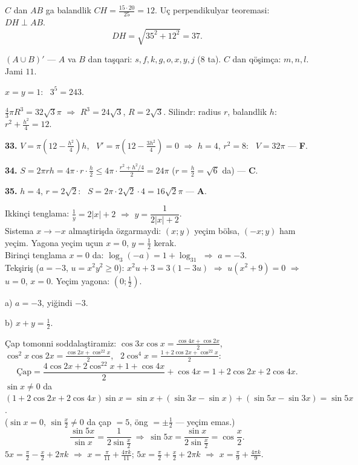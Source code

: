 $C$ dan $AB$ ga balandlik $CH=\frac{15\cdot20}{25}=12$. Uç perpendikulyar teoremasi: $DH\perp AB$.
\[DH=\sqrt{35^2+12^2}=37.\]

$(A\cup B)'$ — $A$ va $B$ dan taşqari: $s,f,k,g,o,x,y,j$ ($8$ ta). $C$ dan qöşimça: $m,n,l$. Jami $11$.

$x=y=1$: \ $3^5=243$.

\newpage
{}
$\frac43\pi R^3=32\sqrt3\pi$ $\Rightarrow$ $R^3=24\sqrt3$, $R=2\sqrt3$. Silindr: radius $r$, balandlik $h$: $r^2+\frac{h^2}4=12$.

\textbf{33.} $V=\pi\left(12-\frac{h^2}4\right)h$, \ $V'=\pi\left(12-\frac{3h^2}4\right)=0$ $\Rightarrow$ $h=4$, $r^2=8$: \ $V=32\pi$ — \textbf{F}.

\textbf{34.} $S=2\pi rh=4\pi\cdot r\cdot\frac h2\le4\pi\cdot\frac{r^2+h^2/4}2=24\pi$ ($r=\frac h2=\sqrt6$ da) — \textbf{C}.

\textbf{35.} $h=4$, $r=2\sqrt2$: \ $S=2\pi\cdot2\sqrt2\cdot4=16\sqrt2\pi$ — \textbf{A}.

\newpage
{}
Ikkinçi tenglama: $\frac1y=2|x|+2$ $\Rightarrow$ $y=\dfrac1{2|x|+2}$.\\
Sistema $x\to-x$ almaştirişda özgarmaydi: $(x;y)$ yeçim bölsa, $(-x;y)$ ham yeçim. Yagona yeçim uçun $x=0$, $y=\frac12$ kerak.\\
Birinçi tenglama $x=0$ da: $\log_3(-a)=1+\log_31$ $\Rightarrow$ $a=-3$.\\
Tekşiriş ($a=-3$, $u=x^2y^2\ge0$): $x^2u+3=3(1-3u)$ $\Rightarrow$ $u\left(x^2+9\right)=0$ $\Rightarrow$ $u=0$, $x=0$. Yeçim yagona: $\left(0;\frac12\right)$.

a) $a=-3$, yiğindi $-3$.

b) $x+y=\frac12$.

\newpage
{}
Çap tomonni soddalaştiramiz: $\cos3x\cos x=\frac{\cos4x+\cos2x}2$, \ $\cos^2x\cos2x=\frac{\cos2x+\cos^22x}2$, \ $2\cos^4x=\frac{1+2\cos2x+\cos^22x}2$:
\[\text{Çap}=\frac{4\cos2x+2\cos^22x+1+\cos4x}2+\cos4x=1+2\cos2x+2\cos4x.\]
$\sin x\ne0$ da $\left(1+2\cos2x+2\cos4x\right)\sin x=\sin x+\left(\sin3x-\sin x\right)+\left(\sin5x-\sin3x\right)=\sin5x$.\\
($\sin x=0$, $\sin\frac x2\ne0$ da çap $=5$, öng $=\pm\frac12$ — yeçim emas.)
\[\frac{\sin5x}{\sin x}=\frac1{2\sin\frac x2}\ \Rightarrow\ \sin5x=\frac{\sin x}{2\sin\frac x2}=\cos\frac x2.\]
$5x=\frac\pi2-\frac x2+2\pi k$ $\Rightarrow$ $x=\frac\pi{11}+\frac{4\pi k}{11}$; \quad $5x=\frac\pi2+\frac x2+2\pi k$ $\Rightarrow$ $x=\frac\pi9+\frac{4\pi k}9$.

